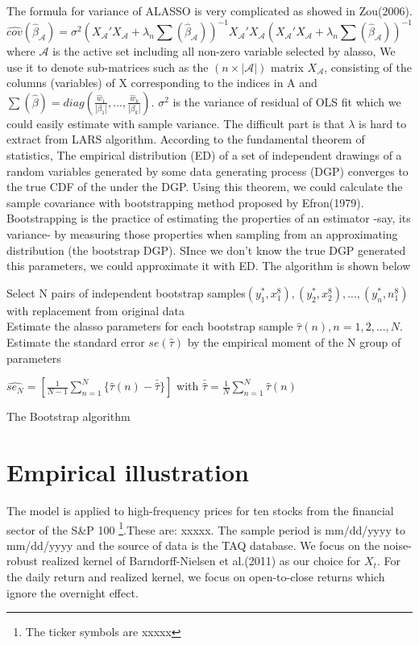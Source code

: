 \documentclass[titlepage,11pt]{article}
\begin{document}
The formula for variance of ALASSO is very complicated as showed in Zou(2006). 
\begin{equation*}
\hat{cov}(\hat{\beta}_{\mathcal{A}}) = \sigma^2 (X_{\mathcal{A}}'X_{\mathcal{A}} + \lambda_n\sum(\hat{\beta}_\mathcal{A}))^{-1} X_{\mathcal{A}}'X_{\mathcal{A}} (X_{\mathcal{A}}'X_{\mathcal{A}} + \lambda_n\sum(\hat{\beta}_\mathcal{A}))^{-1}
\end{equation*}
where 
$\mathcal{A}$ is the active set including all non-zero variable selected by alasso, We use it to denote sub-matrices such as the $(n \times |\mathcal{A}|) $ matrix $X_{\mathcal{A}}$, consisting
of the columns (variables) of X corresponding to the indices in A
and 
$\sum(\hat{\beta}) = diag(\frac{\hat{w}_1}{|\beta_1|},...,\frac{\hat{w}_k}{|\beta_k|})$.
$\sigma^2$ is the variance of residual of OLS fit which we could easily estimate with sample variance. The difficult part is that $\lambda$ is hard to extract from LARS algorithm.
According to the fundamental theorem of statistics, The empirical distribution (ED) of a set of independent drawings of a random variables generated by some data generating process (DGP) converges to the true CDF of the  under the DGP. 
Using this theorem, we could calculate the sample covariance with bootstrapping method proposed by Efron(1979). Bootstrapping is the practice of estimating the properties of an estimator -say, its variance- by measuring those properties when sampling from an approximating distribution (the bootstrap DGP).  SInce we don’t know the true DGP generated this parameters, we could approximate it with ED. The algorithm is shown below 
\begin{algorithm}[!htbp]
	Select N pairs of independent bootstrap samples$(y_1^*, x_1^8),(y_2^*, x_2^8),...,(y_n^*, n_1^8)$ with replacement from original data\\
	Estimate the alasso parameters for each bootstrap sample $\hat{\tau}(n), n=1,2,...,N.$ \\
	Estimate the standard error $se(\hat{\tau})$ by the empirical moment of the N group of parameters
	
	\(\hat{se_N} = \left[\frac{1}{N-1}\sum_{n=1}^{N}\{\hat{\tau}(n)-\bar{\hat{\tau}}\}\right] \) 
	with
	\(	\bar{\hat{\tau}} = \frac{1}{N} \sum_{n=1}^{N}\hat{\tau}(n)\)  
	\caption{The Bootstrap algorithm}
	\label{boot_alg}
\end{algorithm}


\section{Empirical illustration}
The model is applied to high-frequency prices for ten stocks from the financial sector of the S\&P 100 \footnote{The ticker symbols are xxxxx}.These are: xxxxx. The sample period is mm/dd/yyyy to mm/dd/yyyy and the source of data is the TAQ database. We focus on the noise-robust realized kernel of Barndorff-Nielsen et al.(2011) as our choice for $X_t$. For the daily return and realized kernel, we focus on open-to-close returns which ignore the overnight effect.
\end{document}
